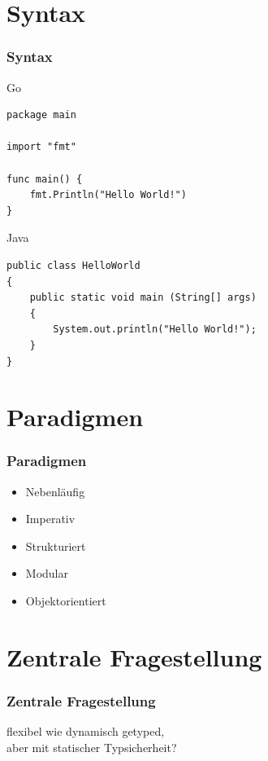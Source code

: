 \documentclass{beamer}
\begin{document}
\section{Syntax}
\begin{frame}[fragile]
\frametitle{Syntax}

Go
\begin{lstlisting}
package main

import "fmt"

func main() {
    fmt.Println("Hello World!")
}
\end{lstlisting}

Java
\lstset{language=Java}
\begin{lstlisting}
public class HelloWorld 
{ 
    public static void main (String[] args)
    {
        System.out.println("Hello World!");
    }
}
\end{lstlisting}

\end{frame}

\section{Paradigmen}
\begin{frame}
\frametitle{Paradigmen}

\begin{itemize}
\setlength{\itemsep}{20pt}
\item Nebenläufig
\item Imperativ
\item Strukturiert
\item Modular
\item Objektorientiert
\end{itemize}

\end{frame}

\section{Zentrale Fragestellung}
\begin{frame}
\frametitle{Zentrale Fragestellung}

\centering
\glqq flexibel wie dynamisch getyped,\\ aber mit statischer Typsicherheit?\grqq{}

\end{frame}
\end{document}
